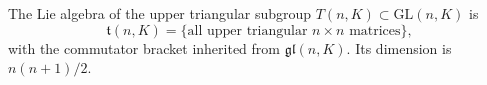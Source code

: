 The Lie algebra of the upper triangular subgroup $T(n, K) \subset \mathrm{GL}(n, K)$ is
$$\mathfrak{t}(n, K) = \{\text{all upper triangular } n \times n \text{ matrices}\},$$
with the commutator bracket inherited from $\mathfrak{gl}(n, K)$. Its dimension is $n(n+1)/2$.
